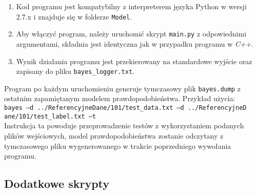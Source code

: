 \begin{enumerate}
	\item Kod programu jest kompatybilny z interpreterem języka Python w wersji 2.7.x i znajduje się w folderze \texttt{Model}.
	\item Aby włączyć program, należy uruchomić skrypt \texttt{main.py} z odpowiednimi argumentami, składnia jest identyczna jak w przypadku programu w \textit{C++}.
	\item Wynik działania programu jest przekierowany na standardowe wyjście oraz zapisany do pliku \texttt{bayes\_logger.txt}.
\end{enumerate}

Program po każdym uruchomieniu generuje tymczasowy plik \texttt{bayes.dump} z ostatnim zapamiętanym modelem prawdopodobieństwa. Przykład użycia:\\
\texttt{bayes --d ../ReferencyjneDane/101/test\_data.txt --d ../ReferencyjneD\\ane/101/test\_label.txt --t}\\ 
Instrukcja ta powoduje przeprowadzenie testów z wykorzystaniem podanych plików wejściowych, model prawdopodobieństwa zostanie odczytany z tymczasowego pliku wygenerowanego w trakcie poprzedniego wywołania programu.

\subsection{Dodatkowe skrypty}
\label{subsec_skrypty_instr}

